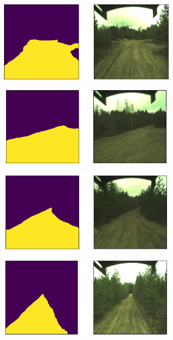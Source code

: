 \documentclass[USenglish]{ifimaster}  %
\begin{document}
\begin{appendices}
\begin{figure}[ht]
\centering
\begin{subfigure}[b]{\textwidth}
\centering
\includegraphics[width=0.95\textwidth]{bilder/appendix_1/2017-05-09-13-26-47-00097.png}
\end{subfigure}
\hfill
\begin{subfigure}[b]{\textwidth}
\centering
\includegraphics[width=0.95\textwidth]{bilder/appendix_1/2017-05-09-13-26-47-00153.png}
\end{subfigure}
\hfill
\begin{subfigure}[b]{\textwidth}
\centering
\includegraphics[width=0.95\textwidth]{bilder/appendix_1/2017-05-09-13-26-47-00172.png}
\end{subfigure}
\hfill
\begin{subfigure}[b]{\textwidth}
\centering
\includegraphics[width=0.95\textwidth]{bilder/appendix_1/2017-05-09-13-26-47-00198.png}

\end{subfigure}
\end{figure}
\end{appendices}
\end{document}
